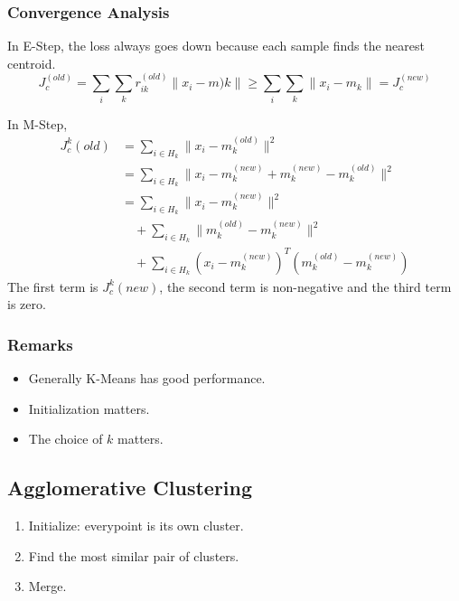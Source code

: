         \subsubsection{Convergence Analysis}
        In E-Step, the loss always goes down because each sample finds the nearest centroid.
        \[ J_c^{(old)} = \sum_i\sum_kr_{ik}^{(old)}\|x_i-m)k\| \ge \sum_i\sum_k\|x_i-m_k\| = J_c^{(new)} \]

        In M-Step,
        \begin{align*}
            J_c^k(old) &= \sum_{i\in H_k}\|x_i - m_k^{(old)}\|^2\\
            &= \sum_{i\in H_k}\| x_i - m_k^{(new)} + m_k^{(new)} - m_k^{(old)} \|^2\\
            &= \sum_{i\in H_k} \|x_i - m_k^{(new)}\|^2\\
            &\quad + \sum_{i\in H_k}\|m_k^{(old)} - m_k^{(new)}\|^2\\
            &\quad + \sum_{i\in H_k}(x_i-m_k^{(new)})^T(m_k^{(old)}-m_k^{(new)})
        \end{align*}
        The first term is $J_c^k(new)$, the second term is non-negative and the third term is zero.

        \subsubsection{Remarks}
        \begin{itemize}
            \item Generally K-Means has good performance.
            \item Initialization matters.
            \item The choice of $k$ matters.
        \end{itemize}

    \subsection{Agglomerative Clustering}
        \begin{enumerate}
            \item Initialize: everypoint is its own cluster.
            \item Find the most similar pair of clusters.
            \item Merge.
        \end{enumerate}
